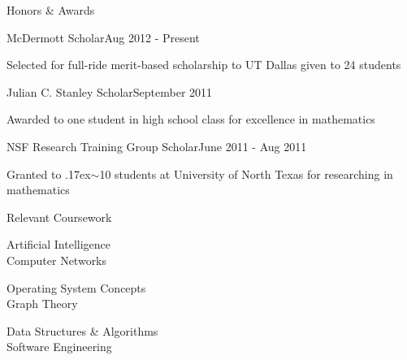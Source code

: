 \documentclass{resume} %
\begin{document}
\begin{rSection}{Honors \& Awards}

\begin{honors_section}{McDermott Scholar}{Aug 2012 - Present}
\item Selected for full-ride merit-based scholarship to UT Dallas given to 24 students
\end{honors_section}

\begin{honors_section}{Julian C. Stanley Scholar}{September 2011}
\item Awarded to one student in high school class for excellence in mathematics
\end{honors_section}

\begin{honors_section}{NSF Research Training Group Scholar}{June 2011 - Aug 2011}
\item Granted to {\raise.17ex\hbox{$\scriptstyle\sim$}}10 students at University of North Texas for researching in mathematics
\end{honors_section}



\end{rSection}

\begin{rSection2}{Relevant Coursework}

\begin{minipage}{0.33\textwidth}
\centering
Artificial Intelligence\\
Computer Networks
\end{minipage}%
\begin{minipage}{0.33\textwidth}
\centering
Operating System Concepts\\
Graph Theory
\end{minipage}%
\begin{minipage}{0.33\textwidth}
\centering
Data Structures \& Algorithms\\
Software Engineering
\end{minipage}

\end{rSection2}
\end{document}
